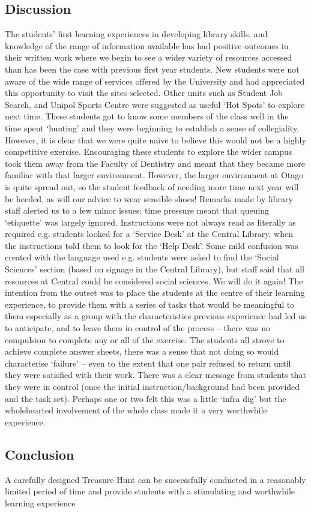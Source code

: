 \subsection{Discussion}

The students’ first learning experiences in developing library skills, and knowledge of the 
range of information available has had positive outcomes in their written work where we 
begin to see a wider variety of resources accessed than has been the case with previous 
first year students. 
New students were not aware of the wide range of services offered by the University and 
had appreciated this opportunity to visit the sites selected. Other units such as Student 
Job Search, and Unipol Sports Centre were suggested as useful ‘Hot Spots’ to explore 
next time. 
These students got to know some members of the class well in the time spent ‘hunting’ 
and they were beginning to establish a sense of collegiality. However, it is clear that we 
were quite naïve to believe this would not be a highly competitive exercise. 
Encouraging these students to explore the wider campus took them away from the Faculty 
of Dentistry and meant that they became more familiar with that larger environment. 
However, the larger environment at Otago is quite spread out, so the student feedback of 
needing more time next year will be heeded, as will our advice to wear sensible shoes! 
Remarks made by library staff alerted us to a few minor issues: time pressure meant that 
queuing ‘etiquette’ was largely ignored. Instructions were not always read as literally as 
required e.g. students looked for a ‘Service Desk’ at the Central Library, when the 
instructions told them to look for the ‘Help Desk’. 
Some mild confusion was created with the language used e.g. students were asked to find 
the ‘Social Sciences’ section (based on signage in the Central Library), but staff said that 
all resources at Central could be considered social sciences. 
We will do it again! The intention from the outset was to place the students at the centre of 
their learning experience, to provide them with a series of tasks that would be meaningful 
to them especially as a group with the characteristics previous experience had led us to anticipate, and to leave them in control of the process – there was no compulsion to 
complete any or all of the exercise. The students all strove to achieve complete answer 
sheets, there was a sense that not doing so would characterise ‘failure’ – even to the 
extent that one pair refused to return until they were satisfied with their work. There was a 
clear message from students that they were in control (once the initial 
instruction/background had been provided and the task set). Perhaps one or two felt this 
was a little ‘infra dig’ but the wholehearted involvement of the whole class made it a very 
worthwhile experience.
\subsection{Conclusion}
A carefully designed Treasure Hunt can be successfully conducted in a reasonably limited 
period of time and provide students with a stimulating and worthwhile learning experience